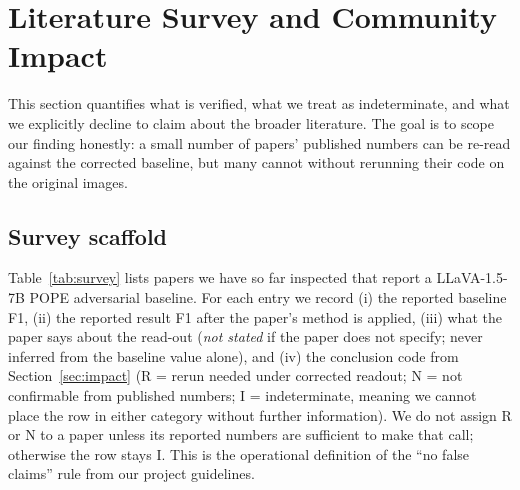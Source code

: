 \documentclass[11pt,letterpaper]{article}
\begin{document}
\section{Literature Survey and Community Impact}
\label{sec:survey}

This section quantifies what is verified, what we treat as
indeterminate, and what we explicitly decline to claim about the
broader literature. The goal is to scope our finding honestly: a
small number of papers' published numbers can be re-read against
the corrected baseline, but many cannot without rerunning their code
on the original images.

\subsection{Survey scaffold}
\label{sec:survey-scaffold}

Table~\ref{tab:survey} lists papers we have so far inspected that
report a LLaVA-1.5-7B POPE adversarial baseline. For each entry we
record (i) the reported baseline F1, (ii) the reported result F1
after the paper's method is applied, (iii) what the paper says about
the read-out (\emph{not stated} if the paper does not specify; never
inferred from the baseline value alone), and (iv) the conclusion code
from Section~\ref{sec:impact} (R = rerun needed under corrected
readout; N = not confirmable from published numbers;
I = indeterminate, meaning we cannot place the row in either
category without further information). We do not assign R or N to a
paper unless its reported numbers are sufficient to make that call;
otherwise the row stays I. This is the operational definition of the
``no false claims'' rule from our project guidelines.
\end{document}
